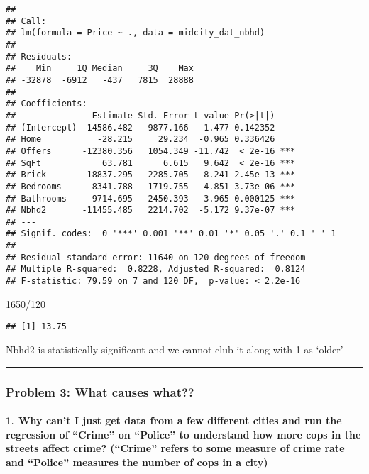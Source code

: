 \documentclass[
]{article}
\newenvironment{Shaded}{\begin{snugshade}}{\end{snugshade}}
\newcommand{\DecValTok}[1]{\textcolor[rgb]{0.00,0.00,0.81}{#1}}
\newcommand{\SpecialCharTok}[1]{\textcolor[rgb]{0.00,0.00,0.00}{#1}}
\begin{document}
\begin{verbatim}
## 
## Call:
## lm(formula = Price ~ ., data = midcity_dat_nbhd)
## 
## Residuals:
##    Min     1Q Median     3Q    Max 
## -32878  -6912   -437   7815  28888 
## 
## Coefficients:
##               Estimate Std. Error t value Pr(>|t|)    
## (Intercept) -14586.482   9877.166  -1.477 0.142352    
## Home           -28.215     29.234  -0.965 0.336426    
## Offers      -12380.356   1054.349 -11.742  < 2e-16 ***
## SqFt            63.781      6.615   9.642  < 2e-16 ***
## Brick        18837.295   2285.705   8.241 2.45e-13 ***
## Bedrooms      8341.788   1719.755   4.851 3.73e-06 ***
## Bathrooms     9714.695   2450.393   3.965 0.000125 ***
## Nbhd2       -11455.485   2214.702  -5.172 9.37e-07 ***
## ---
## Signif. codes:  0 '***' 0.001 '**' 0.01 '*' 0.05 '.' 0.1 ' ' 1
## 
## Residual standard error: 11640 on 120 degrees of freedom
## Multiple R-squared:  0.8228, Adjusted R-squared:  0.8124 
## F-statistic: 79.59 on 7 and 120 DF,  p-value: < 2.2e-16
\end{verbatim}

\begin{Shaded}
\begin{Highlighting}[]
\DecValTok{1650}\SpecialCharTok{/}\DecValTok{120}
\end{Highlighting}
\end{Shaded}

\begin{verbatim}
## [1] 13.75
\end{verbatim}

Nbhd2 is statistically significant and we cannot club it along with 1 as
`older'

\begin{center}\rule{0.5\linewidth}{0.5pt}\end{center}

\hypertarget{problem-3-what-causes-what}{%
\subsubsection{Problem 3: What causes
what??}\label{problem-3-what-causes-what}}

\hypertarget{why-cant-i-just-get-data-from-a-few-different-cities-and-run-the-regression-of-crime-on-police-to-understand-how-more-cops-in-the-streets-affect-crime-crime-refers-to-some-measure-of-crime-rate-and-police-measures-the-number-of-cops-in-a-city}{%
\paragraph{1. Why can't I just get data from a few different cities and
run the regression of ``Crime'' on ``Police'' to understand how more
cops in the streets affect crime? (``Crime'' refers to some measure of
crime rate and ``Police'' measures the number of cops in a
city)}\label{why-cant-i-just-get-data-from-a-few-different-cities-and-run-the-regression-of-crime-on-police-to-understand-how-more-cops-in-the-streets-affect-crime-crime-refers-to-some-measure-of-crime-rate-and-police-measures-the-number-of-cops-in-a-city}}
\end{document}
